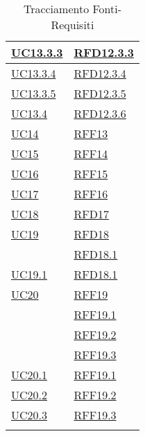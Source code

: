 \begin{longtable}{|>{\centering}m{5cm}|m{5cm}<{\centering}|}
\hyperref[UC13.3.3]{UC13.3.3} & \hyperlink{RFD12.3.3}{RFD12.3.3}\\ \hline
\hyperref[UC13.3.4]{UC13.3.4} & \hyperlink{RFD12.3.4}{RFD12.3.4}\\ \hline
\hyperref[UC13.3.5]{UC13.3.5} & \hyperlink{RFD12.3.5}{RFD12.3.5}\\ \hline
\hyperref[UC13.4]{UC13.4} & \hyperlink{RFD12.3.6}{RFD12.3.6}\\ \hline
\hyperref[UC14]{UC14} & \hyperlink{RFF13}{RFF13}\\ \hline
\hyperref[UC15]{UC15} & \hyperlink{RFF14}{RFF14}\\ \hline
\hyperref[UC16]{UC16} & \hyperlink{RFF15}{RFF15}\\ \hline
\hyperref[UC17]{UC17} & \hyperlink{RFF16}{RFF16}\\ \hline
\hyperref[UC18]{UC18} & \hyperlink{RFD17}{RFD17}\\ \hline
\hyperref[UC19]{UC19} & \hyperlink{RFD18}{RFD18}\\
& \hyperlink{RFD18.1}{RFD18.1}\\ \hline
\hyperref[UC19.1]{UC19.1} & \hyperlink{RFD18.1}{RFD18.1}\\ \hline
\hyperref[UC20]{UC20} & \hyperlink{RFF19}{RFF19}\\
& \hyperlink{RFF19.1}{RFF19.1}\\
& \hyperlink{RFF19.2}{RFF19.2}\\
& \hyperlink{RFF19.3}{RFF19.3}\\ \hline
\hyperref[UC20.1]{UC20.1} & \hyperlink{RFF19.1}{RFF19.1}\\ \hline
\hyperref[UC20.2]{UC20.2} & \hyperlink{RFF19.2}{RFF19.2}\\ \hline
\hyperref[UC20.3]{UC20.3} & \hyperlink{RFF19.3}{RFF19.3}\\ \hline
\caption[Tracciamento Fonti-Requisiti]{Tracciamento Fonti-Requisiti}
\label{tabella:fonti-requi}
\end{longtable}
\clearpage
